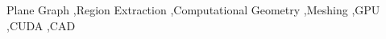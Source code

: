 \documentclass[a4paper,fleqn]{cas-dc}
\begin{document}
\begin{keywords}
Plane Graph \sep Region Extraction \sep  Computational Geometry \sep Meshing \sep GPU \sep CUDA \sep CAD
\end{keywords}


\maketitle













%








\end{document}
